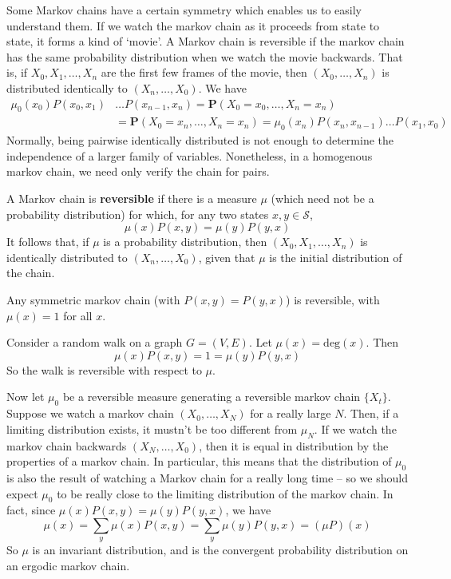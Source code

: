Some Markov chains have a certain symmetry which enables us to easily understand them. If we watch the markov chain as it proceeds from state to state, it forms a kind of `movie'. A Markov chain is reversible if the markov chain has the same probability distribution when we watch the movie backwards. That is, if $X_0, X_1, \dots, X_n$ are the first few frames of the movie, then $(X_0, \dots, X_n)$ is distributed identically to $(X_n, \dots, X_0)$. We have
%
\begin{align*}
    \mu_0(x_0) P(x_0,x_1)&\dots P(x_{n-1},x_n) = \mathbf{P}(X_0 = x_0, \dots, X_n = x_n)\\
    &= \mathbf{P}(X_0 = x_n, \dots, X_n = x_n) = \mu_0(x_n) P(x_n, x_{n-1}) \dots P(x_1,x_0)
\end{align*}
%
Normally, being pairwise identically distributed is not enough to determine the independence of a larger family of variables. Nonetheless, in a homogenous markov chain, we need only verify the chain for pairs.

\begin{definition}
    A Markov chain is {\bf reversible} if there is a measure $\mu$ (which need not be a probability distribution) for which, for any two states $x,y \in \mathcal{S}$,
    \[ \mu(x) P(x,y) = \mu(y) P(y,x) \]
    It follows that, if $\mu$ is a probability distribution, then $(X_0, X_1, \dots,X_n)$ is identically distributed to $(X_n, \dots, X_0)$, given that $\mu$ is the initial distribution of the chain.
\end{definition}

\begin{example}
    Any symmetric markov chain (with $P(x,y) = P(y,x)$) is reversible, with $\mu(x) = 1$ for all $x$.
\end{example}

\begin{example}
    Consider a random walk on a graph $G = (V,E)$. Let $\mu(x) = \text{deg}(x)$. Then
    \[ \mu(x) P(x,y) = 1 = \mu(y) P(y,x) \]
    So the walk is reversible with respect to $\mu$.
\end{example}

Now let $\mu_0$ be a reversible measure  generating a reversible markov chain $\{ X_t \}$. Suppose we watch a markov chain $(X_0, \dots, X_N)$ for a really large $N$. Then, if a limiting distribution exists, it mustn't be too different from $\mu_N$. If we watch the markov chain backwards $(X_N, \dots, X_0)$, then it is equal in distribution by the properties of a markov chain. In particular, this means that the distribution of $\mu_0$ is also the result of watching a Markov chain for a really long time -- so we should expect $\mu_0$ to be really close to the limiting distribution of the markov chain. In fact, since $\mu(x) P(x,y) = \mu(y) P(y,x)$, we have
%
\[ \mu(x) = \sum_y \mu(x) P(x,y) = \sum_y \mu(y) P(y,x) = (\mu P)(x) \]
%
So $\mu$ is an invariant distribution, and is the convergent probability distribution on an ergodic markov chain.

